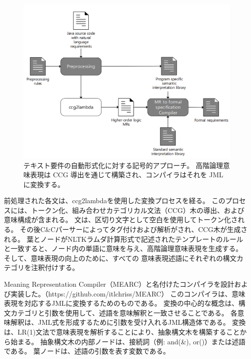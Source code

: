 \documentclass[uplatex, twocolumn,10pt]{jsarticle} %
\begin{document}
\begin{figure}[t]
    \begin{center}
        \includegraphics[width=\linewidth]{../image/TNLR/Fig1_Symb_app.png}
        \caption{テキスト要件の自動形式化に対する記号的アプローチ。
            高階論理意味表現は CCG 導出を通じて構築され、コンパイラはそれを JML に変換する。}
        \label{fig:Symb_app}
    \end{center}
\end{figure}

前処理された各文は、ccg2lambda\cite{3}を使用した変換プロセスを経る。
このプロセスには、トークン化、組み合わせカテゴリカル文法（CCG）木の導出、および意味構成が含まれる。
文は、区切り文字として空白を使用してトークン化される。
その後C\&Cパーサーによってタグ付けおよび解析がされ、CCG木が生成される。
葉とノードがNLTK\cite{7}ラムダ計算形式で記述されたテンプレートのルールと一致すると、ノード内の単語に意味を与え、高階論理意味表現を生成する。
そして、意味表現の向上のために、すべての 意味表現述語にそれぞれの構文カテゴリを注釈付けする。

Meaning Representation Compiler（MEARC）と名付けたコンパイラを設計および実装した。（https://github.com/itlchriss/MEARC）
このコンパイラは、意味表現を対応するJMLに変換するためのものである。
変換の中心的な概念は、構文カテゴリと引数を使用して、述語を意味解釈と一致させることである。
各意味解釈は、JML式を形成するために引数を受け入れるJML構造体である。
変換は、LR(1)文法で意味表現を解析することにより、抽象構文木を構築することから始まる。
抽象構文木の内部ノードは、接続詞（例: and(\&), or(\textbar)）または述語である。
葉ノードは、述語の引数を表す変数である。
\end{document}
